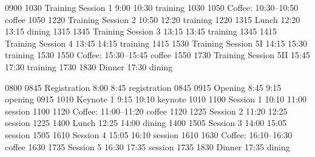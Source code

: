 \begin{timetable}
   {0900} {1030} {Training Session 1}                  {9:00}        {10:30}     {training}
   {1030} {1050} {\vspace{0.1em}Coffee: {\scriptsize 10:30--10:50}}        {}     {} {coffee}
   {1050} {1220} {Training Session 2}               {10:50}         {12:20}   {training}
   {1220} {1315} {Lunch}                  {12:20}        {13:15}     {dining}
   {1315} {1345} {Training Session 3}                       {13:15}         {13:45}   {training}
   {1345} {1415} {Training Session 4}                  {13:45}        {14:15}     {training}
   {1415} {1530} {Training Session 5I}                       {14:15}         {15:30}   {training}
   {1530} {1550} {\vspace{0.1em}Coffee: {\scriptsize 15:30--15:45}}        {}     {} {coffee}
   {1550} {1730} {Training Session 5II}                       {15:45}         {17:30}   {training}
   {1730} {1830} {Dinner}                  {17:30}        {}     {dining}
  
   {0800} {0845} {Registration}               {8:00}      {8:45}     {registration}
   {0845} {0915} {Opening}        {8:45}     {9:15} {opening}
   {0915} {1010} {Keynote 1}                    {9:15}         {10:10} {keynote}
   {1010} {1100} {Session 1}               {10:10}      {11:00}     {session}
   {1100} {1120} {\vspace{0.1em}Coffee: {\scriptsize 11:00--11:20}}        {}     {} {coffee}
   {1120} {1225} {Session 2}               {11:20}      {12:25}     {session}
   {1225} {1400} {Lunch}                  {12:25}        {14:00}     {dining}
   {1400} {1505} {Session 3}               {14:00}      {15:05}     {session}
   {1505} {1610} {Session 4}               {15:05}      {16:10}     {session}
   {1610} {1630} {\vspace{0.1em}Coffee: {\scriptsize 16:10--16:30}}        {}     {} {coffee}
   {1630} {1735} {Session 5}               {16:30}      {17:35}     {session}
   {1735} {1830} {Dinner}                  {17:35}        {}     {dining}
  

\end{timetable}
